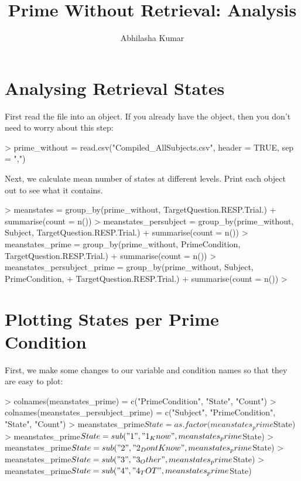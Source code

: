 \documentclass[a4paper]{article}
\title{Prime Without Retrieval: Analysis}
\author{Abhilasha Kumar}
\begin{document}

 \maketitle


\section {Analysing Retrieval States}

First read the file into an object. If you already have the object, then you don't need to worry about this step:

\begin{Schunk}
\begin{Sinput}
> prime_without = read.csv("Compiled_AllSubjects.csv", header = TRUE, sep = ",")
\end{Sinput}
\end{Schunk}

Next, we calculate mean number of states at different levels. Print each object out to see what it contains.  

\begin{Schunk}
\begin{Sinput}
> meanstates = group_by(prime_without, TargetQuestion.RESP.Trial.)%
+     summarise(count = n())
> meanstates_persubject = group_by(prime_without, Subject, TargetQuestion.RESP.Trial.)%
+     summarise(count = n())
> meanstates_prime =  group_by(prime_without, PrimeCondition, TargetQuestion.RESP.Trial.)%
+     summarise(count = n())
> meanstates_persubject_prime =  group_by(prime_without, Subject, PrimeCondition, 
+                                         TargetQuestion.RESP.Trial.)%
+     summarise(count = n())
> 
\end{Sinput}
\end{Schunk}

\section {Plotting States per Prime Condition}

First, we make some changes to our variable and condition names so that they are easy to plot:
\begin{Schunk}
\begin{Sinput}
> colnames(meanstates_prime) = c("PrimeCondition", "State", "Count")
> colnames(meanstates_persubject_prime) = c("Subject", "PrimeCondition", "State", "Count")
> meanstates_prime$State = as.factor(meanstates_prime$State)
> meanstates_prime$State = sub("1", "1_Know", meanstates_prime$State)
> meanstates_prime$State = sub("2", "2_DontKnow", meanstates_prime$State)
> meanstates_prime$State = sub("3", "3_Other", meanstates_prime$State)
> meanstates_prime$State = sub("4", "4_TOT", meanstates_prime$State)
\end{Sinput}
\end{Schunk}
\end{document}
